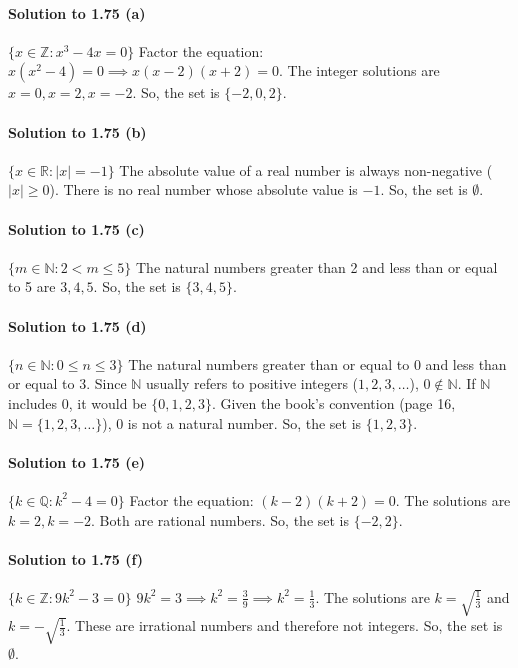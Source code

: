 \documentclass{article}
\begin{document}
\paragraph*{Solution to 1.75 (a)}
$\{x \in \mathbb{Z} : x^3 - 4x = 0\}$
Factor the equation: $x(x^2 - 4) = 0 \implies x(x-2)(x+2) = 0$.
The integer solutions are $x = 0, x = 2, x = -2$.
So, the set is $\{-2, 0, 2\}$.

\paragraph*{Solution to 1.75 (b)}
$\{x \in \mathbb{R} : |x| = -1\}$
The absolute value of a real number is always non-negative ($|x| \ge 0$). There is no real number whose absolute value is $-1$.
So, the set is $\emptyset$.

\paragraph*{Solution to 1.75 (c)}
$\{m \in \mathbb{N} : 2 < m \le 5\}$
The natural numbers greater than 2 and less than or equal to 5 are $3, 4, 5$.
So, the set is $\{3, 4, 5\}$.

\paragraph*{Solution to 1.75 (d)}
$\{n \in \mathbb{N} : 0 \le n \le 3\}$
The natural numbers greater than or equal to 0 and less than or equal to 3. Since $\mathbb{N}$ usually refers to positive integers ($1, 2, 3, \dots$), $0 \notin \mathbb{N}$. If $\mathbb{N}$ includes $0$, it would be $\{0, 1, 2, 3\}$. Given the book's convention (page 16, $\mathbb{N}=\{1,2,3,\dots\}$), $0$ is not a natural number.
So, the set is $\{1, 2, 3\}$.

\paragraph*{Solution to 1.75 (e)}
$\{k \in \mathbb{Q} : k^2 - 4 = 0\}$
Factor the equation: $(k-2)(k+2) = 0$.
The solutions are $k = 2, k = -2$. Both are rational numbers.
So, the set is $\{-2, 2\}$.

\paragraph*{Solution to 1.75 (f)}
$\{k \in \mathbb{Z} : 9k^2 - 3 = 0\}$
$9k^2 = 3 \implies k^2 = \frac{3}{9} \implies k^2 = \frac{1}{3}$.
The solutions are $k = \sqrt{\frac{1}{3}}$ and $k = -\sqrt{\frac{1}{3}}$. These are irrational numbers and therefore not integers.
So, the set is $\emptyset$.
\end{document}
